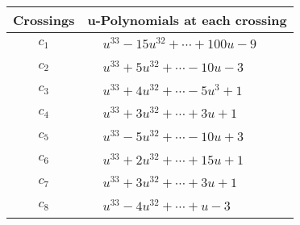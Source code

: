 \documentclass[1p]{elsarticle_modified}
\theoremstyle{definition}
\begin{document}
\begin{tabular}{m{50pt}|m{274pt}}
Crossings & \hspace{64pt}u-Polynomials at each crossing \\
\hline $$\begin{aligned}c_{1}\end{aligned}$$&$\begin{aligned}
&u^{33}-15 u^{32}+\cdots+100 u-9
\end{aligned}$\\
\hline $$\begin{aligned}c_{2}\end{aligned}$$&$\begin{aligned}
&u^{33}+5 u^{32}+\cdots-10 u-3
\end{aligned}$\\
\hline $$\begin{aligned}c_{3}\end{aligned}$$&$\begin{aligned}
&u^{33}+4 u^{32}+\cdots-5 u^3+1
\end{aligned}$\\
\hline $$\begin{aligned}c_{4}\end{aligned}$$&$\begin{aligned}
&u^{33}+3 u^{32}+\cdots+3 u+1
\end{aligned}$\\
\hline $$\begin{aligned}c_{5}\end{aligned}$$&$\begin{aligned}
&u^{33}-5 u^{32}+\cdots-10 u+3
\end{aligned}$\\
\hline $$\begin{aligned}c_{6}\end{aligned}$$&$\begin{aligned}
&u^{33}+2 u^{32}+\cdots+15 u+1
\end{aligned}$\\
\hline $$\begin{aligned}c_{7}\end{aligned}$$&$\begin{aligned}
&u^{33}+3 u^{32}+\cdots+3 u+1
\end{aligned}$\\
\hline $$\begin{aligned}c_{8}\end{aligned}$$&$\begin{aligned}
&u^{33}-4 u^{32}+\cdots+u-3
\end{aligned}$\\

\end{tabular}
\end{document}
